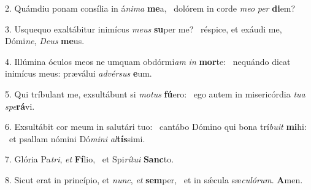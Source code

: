 2. Quámdiu ponam consília in á\textit{ni}\textit{ma} \textbf{me}a, \ast\  dolórem in corde \textit{me}\textit{o} \textit{per} \textbf{di}em?\

3. Usquequo exaltábitur inimícus \textit{me}\textit{us} \textbf{su}per me? \ast\  réspice, et exáudi me, Dómi\textit{ne}, \textit{De}\textit{us} \textbf{me}us.\

4. Illúmina óculos meos ne umquam obdórmi\textit{am} \textit{in} \textbf{mor}te: \ast\  nequándo dicat inimícus meus: præválui \textit{ad}\textit{vér}\textit{sus} \textbf{e}um.\

5. Qui tríbulant me, exsultábunt si \textit{mo}\textit{tus} \textbf{fú}ero: \ast\  ego autem in misericórdia \textit{tu}\textit{a} \textit{spe}\textbf{rá}vi.\

6. Exsultábit cor meum in salutári tuo: \dag\  cantábo Dómino qui bona trí\textit{bu}\textit{it} \textbf{mi}hi: \ast\  et psallam nómini Dó\textit{mi}\textit{ni} \textit{al}\textbf{tís}simi.\

7. Glória Pa\textit{tri}, \textit{et} \textbf{Fí}lio, \ast\  et Spi\textit{rí}\textit{tu}\textit{i} \textbf{Sanc}to.\

8. Sicut erat in princípio, et \textit{nunc}, \textit{et} \textbf{sem}per, \ast\  et in sǽcula sæ\textit{cu}\textit{ló}\textit{rum}. \textbf{A}men.\


